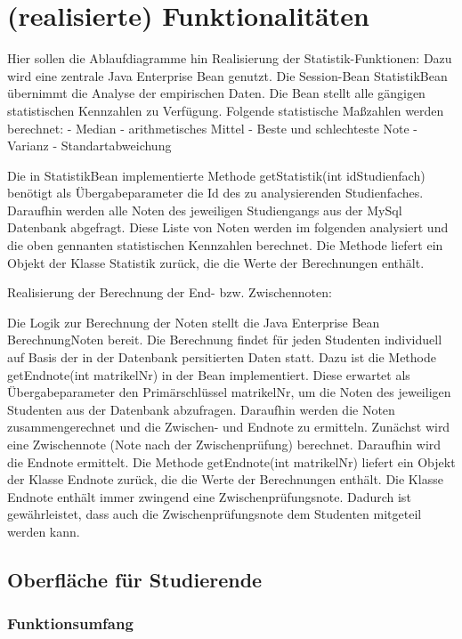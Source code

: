 \documentclass[12pt,a4paper,parskip]{scrreprt}
\begin{document}
\chapter{(realisierte) Funktionalitäten}
Hier sollen die Ablaufdiagramme hin
Realisierung der Statistik-Funktionen:
Dazu wird eine zentrale Java Enterprise Bean genutzt. Die Session-Bean StatistikBean übernimmt die Analyse der empirischen Daten. Die Bean stellt alle gängigen statistischen Kennzahlen zu Verfügung.
Folgende statistische Maßzahlen werden berechnet:
- Median
- arithmetisches Mittel
- Beste und schlechteste Note
- Varianz
- Standartabweichung

Die in StatistikBean implementierte Methode getStatistik(int idStudienfach) benötigt als Übergabeparameter die Id des zu analysierenden Studienfaches. Daraufhin werden alle Noten des jeweiligen Studiengangs aus der MySql Datenbank abgefragt. Diese Liste von Noten werden im folgenden analysiert und die oben gennanten statistischen Kennzahlen berechnet. Die Methode liefert ein Objekt der Klasse Statistik zurück, die die Werte der Berechnungen enthält.


Realisierung der Berechnung der End- bzw. Zwischennoten:

Die Logik zur Berechnung der Noten stellt die Java Enterprise Bean BerechnungNoten bereit. Die Berechnung findet für jeden Studenten individuell auf Basis der in der Datenbank persitierten Daten statt. 
Dazu ist die Methode getEndnote(int matrikelNr) in der Bean implementiert. Diese erwartet als Übergabeparameter den Primärschlüssel matrikelNr, um die Noten des jeweiligen Studenten aus der Datenbank abzufragen. Daraufhin werden die Noten zusammengerechnet und die Zwischen- und Endnote zu ermitteln.
Zunächst wird eine Zwischennote (Note nach der Zwischenprüfung) berechnet. Daraufhin wird die Endnote ermittelt.
Die Methode getEndnote(int matrikelNr) liefert ein Objekt der Klasse Endnote zurück, die die Werte der Berechnungen enthält. Die Klasse Endnote enthält immer zwingend eine Zwischenprüfungsnote. Dadurch ist gewährleistet, dass auch die Zwischenprüfungsnote dem Studenten mitgeteil werden kann.

\section{Oberfläche für Studierende}
\subsection{Funktionsumfang}
\end{document}
